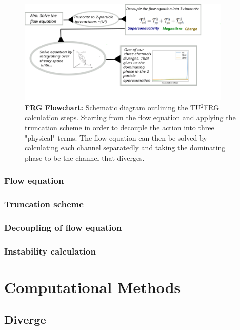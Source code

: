 \documentclass[12pt]{article}
\begin{document}
\begin{figure}[htbp]  %
    \centering
    \includegraphics[width=0.9\textwidth]{FRGflowdiagram.png}  %
    \caption{\textbf{FRG Flowchart:} Schematic diagram outlining the TU$^2$FRG calculation steps. Starting from the flow equation and applying the truncation scheme in order to decouple the action into three "physical" terms. 
    The flow equation can then be solved by calculating each channel separatedly and taking the dominating phase to be the channel that diverges.}
    \label{fig:FRGflowdiagram}
\end{figure}

\subsubsection{Flow equation}

\subsubsection{Truncation scheme}

\subsubsection{Decoupling of flow equation}

\subsubsection{Instability calculation}



\section{Computational Methods}

\subsection{Diverge}
\end{document}
